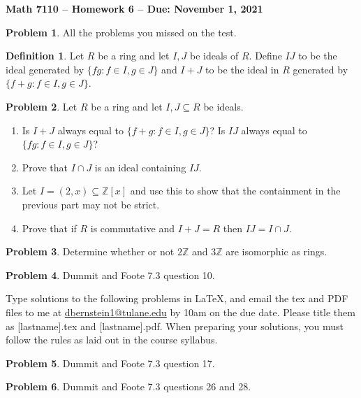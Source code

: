 \documentclass[letterpaper,11pt]{amsart}
\theoremstyle{plain}
\theoremstyle{definition}
\newtheorem*{defn*}{Definition}
\newtheorem{pr}{Problem}
\theoremstyle{remark}
\begin{document}
\Large

\begin{center}
{\bf Math 7110 -- Homework  6 --  Due:  November 1, 2021}
\end{center}

\normalsize


\medskip


\begin{pr}
    All the problems you missed on the test.
\end{pr}

\begin{defn*}
    Let $R$ be a ring and let $I,J$ be ideals of $R$. Define $IJ$ to be the ideal generated by $\{fg: f \in I, g \in J\}$
    and $I + J$ to be the ideal in $R$ generated by $\{f + g : f \in I, g \in J\}$.
\end{defn*}

\begin{pr}
    Let $R$ be a ring and let $I,J\subseteq R$ be ideals. 
    \begin{enumerate}
        \item Is $I + J$ always equal to $\{f+g:f \in I, g \in J\}$? Is $IJ$ always equal to $\{fg : f \in I, g \in J\}$?
        \item Prove that $I\cap J$ is an ideal containing $IJ$.
        \item Let $I = (2,x) \subseteq \mathbb{Z}[x]$ and use this to show that the containment in the previous part may not be strict.
        \item Prove that if $R$ is commutative and $I+J=R$ then $IJ = I\cap J$.
    \end{enumerate}
\end{pr}


\begin{pr}
    Determine whether or not $2\mathbb{Z}$ and $3\mathbb{Z}$ are isomorphic as rings.
\end{pr}

\begin{pr}
    Dummit and Foote 7.3 question 10.
\end{pr}


\bigskip

Type solutions to the following problems in \LaTeX, and email the tex and PDF files to me at \url{dbernstein1@tulane.edu} by 10am on the due date.
Please title them as [lastname].tex and [lastname].pdf.
When preparing your solutions, you must follow the rules as laid out in the course syllabus.

\vspace{.5cm}


\begin{pr}
    Dummit and Foote 7.3 question 17.
\end{pr}


\begin{pr}
    Dummit and Foote 7.3 questions 26 and 28.
\end{pr}
\end{document}
